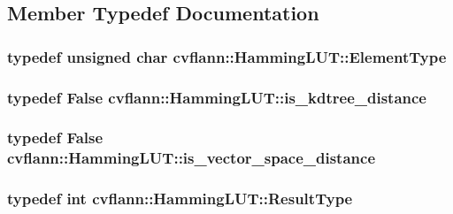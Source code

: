 \subsection{Member Typedef Documentation}
\hypertarget{structcvflann_1_1HammingLUT_afb774f8aaf272c2806f6b0516b47d3ad}{
\subsubsection[{Element\-Type}]{\setlength{\rightskip}{0pt plus 5cm}typedef unsigned char {\bf cvflann\-::\-Hamming\-L\-U\-T\-::\-Element\-Type}}}\label{structcvflann_1_1HammingLUT_afb774f8aaf272c2806f6b0516b47d3ad}
\hypertarget{structcvflann_1_1HammingLUT_a079b4722221e8938f9737527e03069b3}{
\subsubsection[{is\-\_\-kdtree\-\_\-distance}]{\setlength{\rightskip}{0pt plus 5cm}typedef {\bf False} {\bf cvflann\-::\-Hamming\-L\-U\-T\-::is\-\_\-kdtree\-\_\-distance}}}\label{structcvflann_1_1HammingLUT_a079b4722221e8938f9737527e03069b3}
\hypertarget{structcvflann_1_1HammingLUT_a31aace22379406498714791781139cd4}{
\subsubsection[{is\-\_\-vector\-\_\-space\-\_\-distance}]{\setlength{\rightskip}{0pt plus 5cm}typedef {\bf False} {\bf cvflann\-::\-Hamming\-L\-U\-T\-::is\-\_\-vector\-\_\-space\-\_\-distance}}}\label{structcvflann_1_1HammingLUT_a31aace22379406498714791781139cd4}
\hypertarget{structcvflann_1_1HammingLUT_a022e0260e3ecd3a202fadf6a52cba436}{
\subsubsection[{Result\-Type}]{\setlength{\rightskip}{0pt plus 5cm}typedef int {\bf cvflann\-::\-Hamming\-L\-U\-T\-::\-Result\-Type}}}\label{structcvflann_1_1HammingLUT_a022e0260e3ecd3a202fadf6a52cba436}



